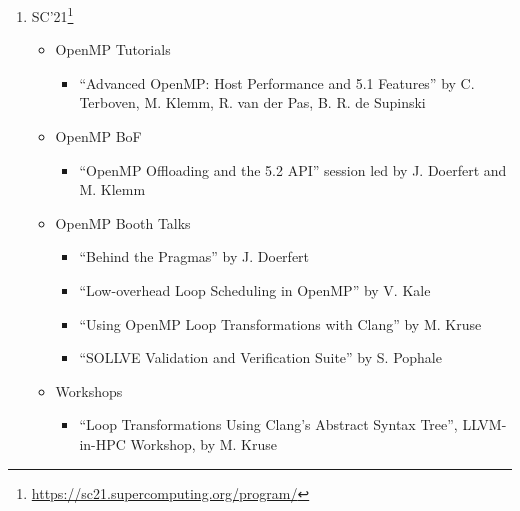 \begin{enumerate}
\item SC'21\footnote{\url{https://sc21.supercomputing.org/program/}}
\begin{itemize}
    \item OpenMP Tutorials
    \begin{itemize}
        \item \enquote{Advanced OpenMP: Host Performance and 5.1 Features} by C. Terboven, M. Klemm, R. van der Pas, B. R. de Supinski
    \end{itemize}
    \item OpenMP BoF
    \begin{itemize}
        \item \enquote{OpenMP Offloading and the 5.2 API} session led by J. Doerfert and M. Klemm 
    \end{itemize}
    \item OpenMP Booth Talks
    \begin{itemize}
        \item \enquote{Behind the Pragmas} by J. Doerfert
        \item \enquote{Low-overhead Loop Scheduling in OpenMP} by V. Kale
        \item \enquote{Using OpenMP Loop Transformations with Clang} by M. Kruse
        \item \enquote{SOLLVE Validation and Verification Suite} by S. Pophale
    \end{itemize}
    \item Workshops
    \begin{itemize}
        \item \enquote{Loop Transformations Using Clang’s Abstract Syntax Tree}, LLVM-in-HPC Workshop, by M. Kruse
    \end{itemize}
\end{itemize}


\end{enumerate} 
    
      

     

 